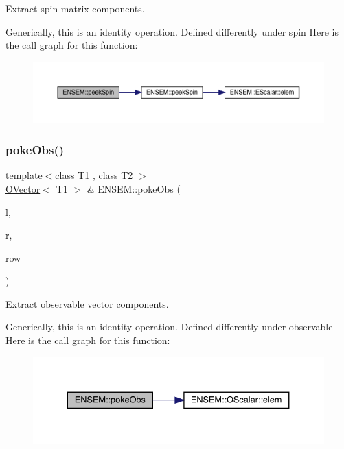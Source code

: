 Extract spin matrix components. 

Generically, this is an identity operation. Defined differently under spin Here is the call graph for this function\+:\nopagebreak
\begin{figure}[H]
\begin{center}
\leavevmode
\includegraphics[width=350pt]{da/d59/group__obsvector_gab454ed8a07dbd29bbb2851736c4635e6_cgraph}
\end{center}
\end{figure}
\mbox{\label{group__obsvector_gab682185c869b882a5be5eedf4fee8e74}} 
\subsubsection{\texorpdfstring{pokeObs()}{pokeObs()}}
{\footnotesize\ttfamily template$<$class T1 , class T2 $>$ \\
\mbox{\hyperlink{classENSEM_1_1OVector}{O\+Vector}}$<$ T1 $>$ \& E\+N\+S\+E\+M\+::poke\+Obs (\begin{DoxyParamCaption}\item[{\mbox{\hyperlink{classENSEM_1_1OVector}{O\+Vector}}$<$ T1 $>$ \&}]{l,  }\item[{const \mbox{\hyperlink{classENSEM_1_1OScalar}{O\+Scalar}}$<$ T2 $>$ \&}]{r,  }\item[{int}]{row }\end{DoxyParamCaption})\hspace{0.3cm}{\ttfamily [inline]}}



Extract observable vector components. 

Generically, this is an identity operation. Defined differently under observable Here is the call graph for this function\+:\nopagebreak
\begin{figure}[H]
\begin{center}
\leavevmode
\includegraphics[width=334pt]{da/d59/group__obsvector_gab682185c869b882a5be5eedf4fee8e74_cgraph}
\end{center}
\end{figure}
\mbox{\label{group__obsvector_gadea0fd5400f7060852f3cd990c3a8ab3}} 
